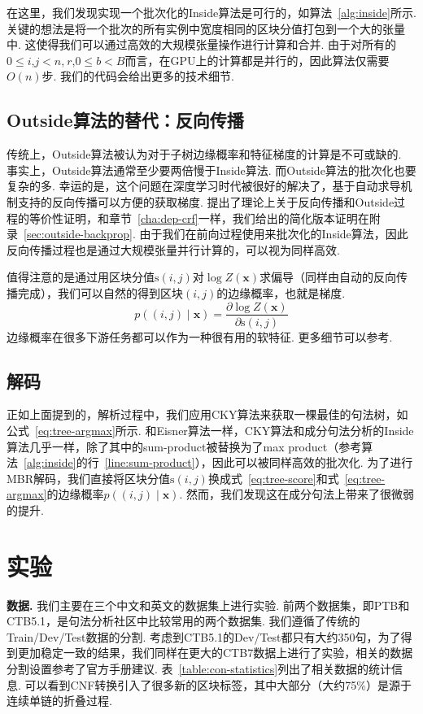 在这里，我们发现实现一个批次化的Inside算法是可行的，如算法~\ref{alg:inside}所示.
关键的想法是将一个批次的所有实例中宽度相同的区块分值打包到一个大的张量中.
这使得我们可以通过高效的大规模张量操作进行计算和合并.
由于对所有的$0 \le i$,$j<n$,$~r$,$0\le b<B$而言，在GPU上的计算都是并行的，因此算法仅需要$O(n)$步.
我们的代码会给出更多的技术细节.

\subsection{Outside算法的替代：反向传播}

传统上，Outside算法被认为对于子树边缘概率和特征梯度的计算是不可或缺的.
事实上，Outside算法通常至少要两倍慢于Inside算法.
而Outside算法的批次化也要复杂的多.
幸运的是，这个问题在深度学习时代被很好的解决了，基于自动求导机制支持的反向传播可以方便的获取梯度.
\cite{eisner-2016-inside}提出了理论上关于反向传播和Outside过程的等价性证明，和章节~\ref{cha:dep-crf}一样，我们给出的简化版本证明在附录~\ref{sec:outside-backprop}.
由于我们在前向过程使用来批次化的Inside算法，因此反向传播过程也是通过大规模张量并行计算的，可以视为同样高效.

值得注意的是通过用区块分值$\mathrm{s}(i,j)$对$\log Z(\boldsymbol{x})$求偏导（同样由自动的反向传播完成），我们可以自然的得到区块$(i,j)$的边缘概率，也就是梯度.
\begin{equation} \label{eq:partial-derivative}
    p((i, j)\mid\boldsymbol{x}) = \frac{\partial \log Z(\boldsymbol{x})}{\partial \mathrm{s}(i, j)}
\end{equation}
边缘概率在很多下游任务都可以作为一种很有用的软特征.
更多细节可以参考\cite{eisner-2016-inside}.

\subsection{解码}

正如上面提到的，解析过程中，我们应用CKY算法来获取一棵最佳的句法树，如公式~\ref{eq:tree-argmax}所示.
和Eisner算法一样，CKY算法和成分句法分析的Inside算法几乎一样，除了其中的sum-product被替换为了max product（参考算法~\ref{alg:inside}的行~\ref{line:sum-product}），因此可以被同样高效的批次化.
为了进行MBR解码，我们直接将区块分值$\mathrm{s}(i,j)$换成式~\ref{eq:tree-score}和式~\ref{eq:tree-argmax}的边缘概率$p((i,j)\mid\boldsymbol{x})$.
然而，我们发现这在成分句法上带来了很微弱的提升.



\section{实验}
\label{sec:con-experiments}
\noindent\textbf{数据.}
我们主要在三个中文和英文的数据集上进行实验.
前两个数据集，即PTB和CTB5.1，是句法分析社区中比较常用的两个数据集.
我们遵循了传统的Train/Dev/Test数据的分割.
考虑到CTB5.1的Dev/Test都只有大约350句，为了得到更加稳定一致的结果，我们同样在更大的CTB7数据上进行了实验，相关的数据分割设置参考了官方手册建议.
表~\ref{table:con-statistics}列出了相关数据的统计信息.
可以看到CNF转换引入了很多新的区块标签，其中大部分（大约75\%）是源于连续单链的折叠过程.

